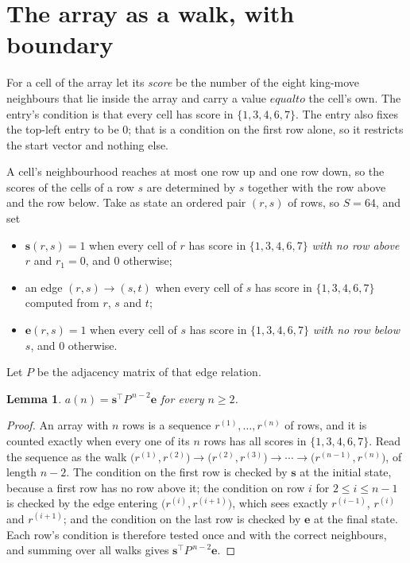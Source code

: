 \documentclass[11pt,a4paper]{article}
\theoremstyle{plain}
\newtheorem{lemma}[theorem]{Lemma}
\theoremstyle{definition}
\begin{document}
\section{The array as a walk, with boundary}

For a cell of the array let its \emph{score} be the number of the eight king-move neighbours that lie inside
the array and carry a value $equal to$ the cell's own. The entry's condition is that every cell
has score in $\{1,3,4,6,7\}$. The entry also fixes the top-left entry to be $0$; that is a condition on the first row alone, so it restricts the start vector and nothing else.

A cell's neighbourhood reaches at most one row up and one row down, so the scores of the
cells of a row $s$ are determined by $s$ together with the row above and the row below.
Take as state an ordered pair $(r,s)$ of rows, so $S=64$, and set
\begin{itemize}
\item $\mathbf{s}(r,s)=1$ when every cell of $r$ has score in $\{1,3,4,6,7\}$ \emph{with no row
above $r$} and $r_1=0$, and $0$ otherwise;
\item an edge $(r,s)\to(s,t)$ when every cell of $s$ has score in $\{1,3,4,6,7\}$ computed from
$r$, $s$ and $t$;
\item $\mathbf{e}(r,s)=1$ when every cell of $s$ has score in $\{1,3,4,6,7\}$ \emph{with no row
below $s$}, and $0$ otherwise.
\end{itemize}
Let $P$ be the adjacency matrix of that edge relation.

\begin{lemma}\label{lem:walk}
$a(n)=\mathbf{s}^{\!\top}P^{\,n-2}\mathbf{e}$ for every $n\ge2$.
\end{lemma}

\begin{proof}
An array with $n$ rows is a sequence $r^{(1)},\dots,r^{(n)}$ of rows, and it is counted
exactly when every one of its $n$ rows has all scores in $\{1,3,4,6,7\}$. Read the sequence as the
walk $\bigl(r^{(1)},r^{(2)}\bigr)\to\bigl(r^{(2)},r^{(3)}\bigr)\to\cdots\to
\bigl(r^{(n-1)},r^{(n)}\bigr)$, of length $n-2$. The condition on the first row is
checked by $\mathbf{s}$ at the initial state, because a first row has no row above it; the
condition on row $i$ for $2\le i\le n-1$ is checked by the edge entering
$\bigl(r^{(i)},r^{(i+1)}\bigr)$, which sees exactly $r^{(i-1)}$, $r^{(i)}$ and
$r^{(i+1)}$; and the condition on the last row is checked by $\mathbf{e}$ at the final
state. Each row's condition is therefore tested once and with the correct neighbours, and
summing over all walks gives $\mathbf{s}^{\!\top}P^{\,n-2}\mathbf{e}$.
\end{proof}
\end{document}
